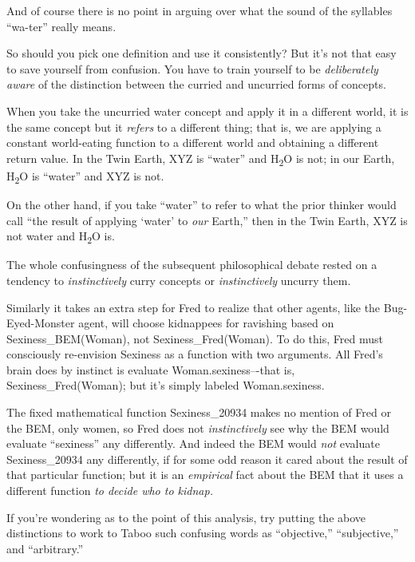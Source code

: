 {
 And of course there is no point in arguing over what the sound of
the syllables ``wa-ter'' really
means.}

{
 So should you pick one definition and use it consistently? But
it's not that easy to save yourself from confusion. You
have to train yourself to be \textit{deliberately aware} of the
distinction between the curried and uncurried forms of concepts.}

{
 When you take the uncurried water concept and apply it in a
different world, it is the same concept but it \textit{refers} to a
different thing; that is, we are applying a constant world-eating
function to a different world and obtaining a different return value.
In the Twin Earth, XYZ is ``water''
and H\textsubscript{2}O is not; in our Earth, H\textsubscript{2}O is
``water'' and XYZ is not.}

{
 On the other hand, if you take
``water'' to refer to what the prior
thinker would call ``the result of applying
`water' to \textit{our}
Earth,'' then in the Twin Earth, XYZ is not water and
H\textsubscript{2}O is.}

{
 The whole confusingness of the subsequent philosophical debate
rested on a tendency to \textit{instinctively} curry concepts or
\textit{instinctively} uncurry them.}

{
 Similarly it takes an extra step for Fred to realize that other
agents, like the Bug-Eyed-Monster agent, will choose kidnappees for
ravishing based on Sexiness\_BEM(Woman), not Sexiness\_Fred(Woman). To
do this, Fred must consciously re-envision Sexiness as a function with
two arguments. All Fred's brain does by instinct is
evaluate Woman.sexiness--{}-that is, Sexiness\_Fred(Woman); but
it's simply labeled Woman.sexiness.}

{
 The fixed mathematical function Sexiness\_20934 makes no mention
of Fred or the BEM, only women, so Fred does not \textit{instinctively}
see why the BEM would evaluate
``sexiness'' any differently. And
indeed the BEM would \textit{not} evaluate Sexiness\_20934 any
differently, if for some odd reason it cared about the result of that
particular function; but it is an \textit{empirical} fact about the BEM
that it uses a different function \textit{to decide who to kidnap.}}

{
 If you're wondering as to the point of this
analysis, try putting the above distinctions to work to Taboo such
confusing words as ``objective,''
``subjective,'' and
``arbitrary.''}

{\centering
 \ ~
\par}

